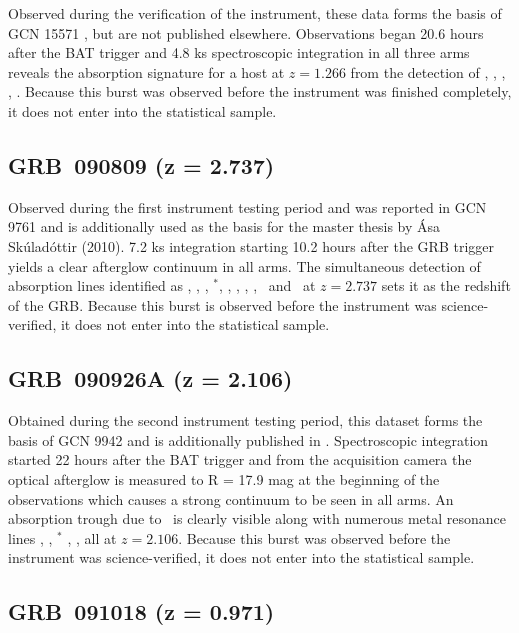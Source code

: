 \documentclass[longauth]{aa}    %
\begin{document}
Observed during the verification of the instrument, these data forms the basis of
GCN 15571 \citep{GCN15571}, but are not published elsewhere. Observations began
20.6 hours after the BAT trigger and 4.8 ks spectroscopic integration in all
three arms reveals the absorption signature for a host at $z = 1.266$ from the
detection of \mgii, \mgi, \SIii, \feii, \aliii. Because this burst was observed
before the instrument was finished completely, it does not enter into the
statistical sample.

\subsection{GRB~090809 (z = 2.737)} \label{090809}

Observed during the first instrument testing period and was reported in GCN
9761 \citep{GCN.9761} and is additionally used as the basis for the master
thesis by \'Asa Sk\'ulad\'ottir (2010). 7.2 ks integration starting 10.2 hours
after the GRB trigger yields a clear afterglow continuum in all arms. The
simultaneous detection of absorption lines identified as \lya, \SIii, \oi,
\SIi$^*$, \SIiv, \civ, \feii, \alii, \aliii~and \mgii~at $z = 2.737$ sets it as
the redshift of the GRB. Because this burst is observed before the instrument
was science-verified, it does not enter into the statistical sample.

\subsection{GRB~090926A (z = 2.106)} \label{090926}

Obtained during the second instrument testing period, this dataset forms the
basis of GCN 9942 \citep{GCN.9942} and is additionally published in
\citet{DElia2010}. Spectroscopic integration started 22 hours after the BAT
trigger and from the acquisition camera the optical afterglow is measured to R =
17.9 mag at the beginning of the observations which causes a strong continuum to
be seen in all arms. An absorption trough due to \lya~is clearly visible along
with numerous metal resonance lines \civ, \SIii, \SIii$^*$ \feii, \mgii, all at
$z = 2.106$. Because this burst was observed before the instrument was
science-verified, it does not enter into the statistical sample.

\subsection{GRB~091018 (z = 0.971)}\label{091018}
\end{document}
